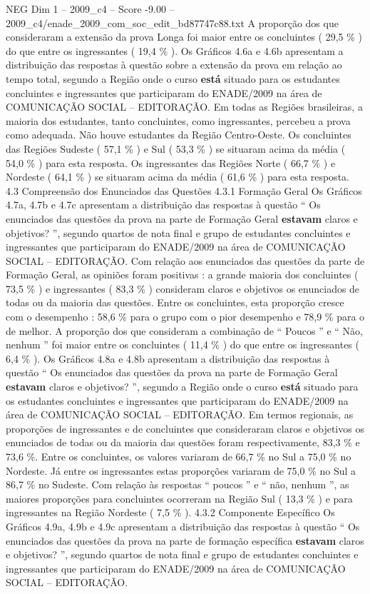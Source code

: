 \begin{textsample}{NEG Dim 1 – 2009\_c4 – Score -9.00 – 2009\_c4/enade\_2009\_com\_soc\_edit\_bd87747c88.txt}
A proporção dos que consideraram a extensão da prova Longa foi maior entre os concluintes ( 29,5 \% ) do que entre os ingressantes ( 19,4 \% ).
Os Gráficos 4.6a e 4.6b apresentam a distribuição das respostas à questão sobre a extensão da prova em relação ao tempo total, segundo a Região onde o curso \textbf{está} situado para os estudantes concluintes e ingressantes que participaram do ENADE/2009 na área de COMUNICAÇÃO SOCIAL – EDITORAÇÃO.
Em todas as Regiões brasileiras, a maioria dos estudantes, tanto concluintes, como ingressantes, percebeu a prova como adequada.
Não houve estudantes da Região Centro-Oeste.
Os concluintes das Regiões Sudeste ( 57,1 \% ) e Sul ( 53,3 \% ) se situaram acima da média ( 54,0 \% ) para esta resposta.
Os ingressantes das Regiões Norte ( 66,7 \% ) e Nordeste ( 64,1 \% ) se situaram acima da média ( 61,6 \% ) para esta resposta. 4.3 Compreensão dos Enunciados das Questões 4.3.1 Formação Geral Os Gráficos 4.7a, 4.7b e 4.7c apresentam a distribuição das respostas à questão “ Os enunciados das questões da prova na parte de Formação Geral \textbf{estavam} claros e objetivos? ”, segundo quartos de nota final e grupo de estudantes concluintes e ingressantes que participaram do ENADE/2009 na área de COMUNICAÇÃO SOCIAL – EDITORAÇÃO.
Com relação aos enunciados das questões da parte de Formação Geral, as opiniões foram positivas : a grande maioria dos concluintes ( 73,5 \% ) e ingressantes ( 83,3 \% ) consideram claros e objetivos os enunciados de todas ou da maioria das questões.
Entre os concluintes, esta proporção cresce com o desempenho : 58,6 \% para o grupo com o pior desempenho e 78,9 \% para o de melhor.
A proporção dos que consideram a combinação de “ Poucos ” e “ Não, nenhum ” foi maior entre os concluintes ( 11,4 \% ) do que entre os ingressantes ( 6,4 \% ).
Os Gráficos 4.8a e 4.8b apresentam a distribuição das respostas à questão “ Os enunciados das questões da prova na parte de Formação Geral \textbf{estavam} claros e objetivos? ”, segundo a Região onde o curso \textbf{está} situado para os estudantes concluintes e ingressantes que participaram do ENADE/2009 na área de COMUNICAÇÃO SOCIAL – EDITORAÇÃO.
Em termos regionais, as proporções de ingressantes e de concluintes que consideraram claros e objetivos os enunciados de todas ou da maioria das questões foram respectivamente, 83,3 \% e 73,6 \%.
Entre os concluintes, os valores variaram de 66,7 \% no Sul a 75,0 \% no Nordeste.
Já entre os ingressantes estas proporções variaram de 75,0 \% no Sul a 86,7 \% no Sudeste.
Com relação às respostas “ poucos ” e “ não, nenhum ”, as maiores proporções para concluintes ocorreram na Região Sul ( 13,3 \% ) e para ingressantes na Região Nordeste ( 7,5 \% ). 4.3.2 Componente Específico Os Gráficos 4.9a, 4.9b e 4.9c apresentam a distribuição das respostas à questão “ Os enunciados das questões da prova na parte de formação específica \textbf{estavam} claros e objetivos? ”, segundo quartos de nota final e grupo de estudantes concluintes e ingressantes que participaram do ENADE/2009 na área de COMUNICAÇÃO SOCIAL – EDITORAÇÃO.

\end{textsample}
